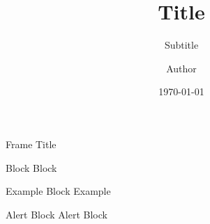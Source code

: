 \documentclass[aspectratio=169, 11pt]{beamer}
\title{Title}
\author{Subtitle}
\author{Author}
\institute{Institution}
\date{\today}
\begin{document}
\begin{frame}[fragile]
    \maketitle
\end{frame}

\begin{frame}{Frame Title}
    \begin{block}{Block}
        Block
    \end{block}

    \begin{exampleblock}{Example Block}
        Example
    \end{exampleblock}

    \begin{alertblock}{Alert Block}
        Alert Block
    \end{alertblock}
\end{frame}
\end{document}
